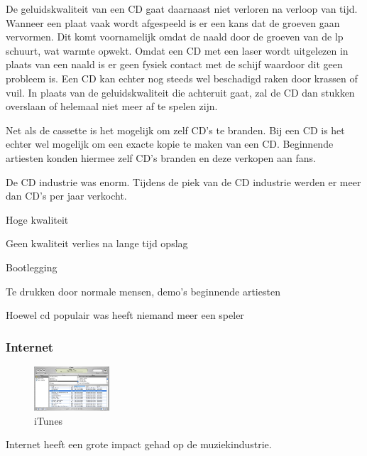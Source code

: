De geluidskwaliteit van een CD gaat daarnaast niet verloren na verloop van tijd. Wanneer een plaat vaak wordt afgespeeld is er een kans dat de groeven gaan vervormen. Dit komt voornamelijk omdat de naald door de groeven van de lp schuurt, wat warmte opwekt. Omdat een CD met een laser wordt uitgelezen in plaats van een naald is er geen fysiek contact met de schijf waardoor dit geen probleem is. Een CD kan echter nog steeds wel beschadigd raken door krassen of vuil. In plaats van de geluidskwaliteit die achteruit gaat, zal de CD dan stukken overslaan of helemaal niet meer af te spelen zijn.

Net als de cassette is het mogelijk om zelf CD's te branden. Bij een CD is het echter wel mogelijk om een exacte kopie te maken van een CD. Beginnende artiesten konden hiermee zelf CD's branden en deze verkopen aan fans.

De CD industrie was enorm. Tijdens de piek van de CD industrie werden er meer dan  CD's per jaar verkocht.


\begin{todolist}
    \item[\done] Hoge kwaliteit
    \item[\done] Geen kwaliteit verlies na lange tijd opslag
    \item Bootlegging
    \item[\done] Te drukken door normale mensen, demo's beginnende artiesten
    \item Hoewel cd populair was heeft niemand meer een speler
\end{todolist}

\subsubsection*{Internet}
\begin{figure}
    \centering
    \includegraphics[width=0.25\textwidth]{assets/critical-review/iTunes_v1.jpeg}
    \caption{iTunes}
    \label{fig:critical-review:iTunes}
\end{figure}

Internet heeft een grote impact gehad op de muziekindustrie.

